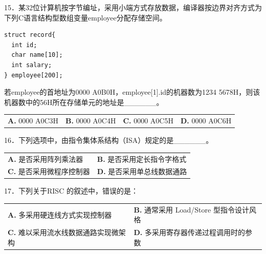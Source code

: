 \documentclass[UTF8,11pt]{ctexart}
\begin{document}
15．某32位计算机按字节编址，采用小端方式存放数据，编译器按边界对齐方式为下列C语言结构型数组变量employee分配存储空间。


\begin{Verbatim}[breaklines,breakanywhere,fontsize=\small]
struct record{
  int id;
  char name[10];
  int salary;
} employee[200];
\end{Verbatim}

若employee的首地址为0000 A0B0H，employee[1].id的机器数为1234 5678H，则该机器数中的56H所在存储单元的地址是\_\_\_\_\_\_。


\begin{center}\begin{tabular}{>{\raggedright\arraybackslash}p{\dimexpr(\linewidth-8\tabcolsep)/4\relax}>{\raggedright\arraybackslash}p{\dimexpr(\linewidth-8\tabcolsep)/4\relax}>{\raggedright\arraybackslash}p{\dimexpr(\linewidth-8\tabcolsep)/4\relax}>{\raggedright\arraybackslash}p{\dimexpr(\linewidth-8\tabcolsep)/4\relax}}
\textbf{A.} 0000 A0C3H & \textbf{B.} 0000 A0C4H & \textbf{C.} 0000 A0C5H & \textbf{D.} 0000 A0C6H\\[.35em]\end{tabular}\end{center}

16．下列选项中，由指令集体系结构（ISA）规定的是\_\_\_\_\_\_。


\begin{center}\begin{tabular}{>{\raggedright\arraybackslash}p{\dimexpr(\linewidth-4\tabcolsep)/2\relax}>{\raggedright\arraybackslash}p{\dimexpr(\linewidth-4\tabcolsep)/2\relax}}
\textbf{A.} 是否采用阵列乘法器 & \textbf{B.} 是否采用定长指令字格式\\[.35em]
\textbf{C.} 是否采用微程序控制器 & \textbf{D.} 是否采用单总线数据通路\\[.35em]\end{tabular}\end{center}

17．下列关于RISC 的叙述中，错误的是：


\begin{center}\begin{tabular}{>{\raggedright\arraybackslash}p{\dimexpr(\linewidth-4\tabcolsep)/2\relax}>{\raggedright\arraybackslash}p{\dimexpr(\linewidth-4\tabcolsep)/2\relax}}
\textbf{A.} 多采用硬连线方式实现控制器 & \textbf{B.} 通常采用 Load/Store 型指令设计风格\\[.35em]
\textbf{C.} 难以采用流水线数据通路实现微架构 & \textbf{D.} 多采用寄存器传递过程调用时的参数\\[.35em]\end{tabular}\end{center}
\end{document}
